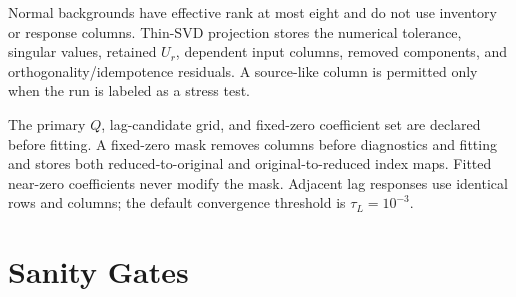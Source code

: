 Normal backgrounds have effective rank at most eight and do not use inventory
or response columns.  Thin-SVD projection stores the numerical tolerance,
singular values, retained \(U_r\), dependent input columns, removed components,
and orthogonality/idempotence residuals.  A source-like column is permitted only
when the run is labeled as a stress test.

The primary \(Q\), lag-candidate grid, and fixed-zero coefficient set are
declared before fitting.  A fixed-zero mask removes columns before diagnostics
and fitting and stores both reduced-to-original and original-to-reduced index
maps.  Fitted near-zero coefficients never modify the mask.  Adjacent lag
responses use identical rows and columns; the default convergence threshold is
\(\tau_L=10^{-3}\).

\section{Sanity Gates}
\label{app:sanity_gates}

